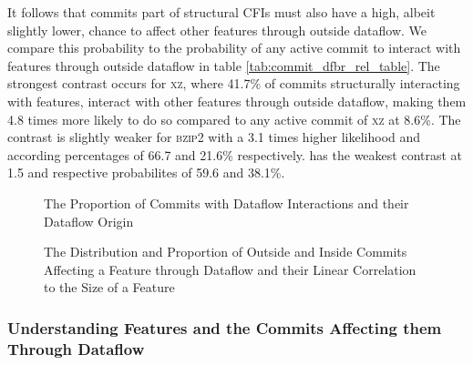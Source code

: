 It follows that commits part of structural CFIs must also have a high, albeit slightly lower, chance to affect other features through outside dataflow.
We compare this probability to the probability of any active commit to interact with features through outside dataflow in table \ref{tab:commit_dfbr_rel_table}.
The strongest contrast occurs for \textsc{xz}, where 41.7\% of commits structurally interacting with features, interact with other features through outside dataflow, making them 4.8 times more likely to do so compared to any active commit of \textsc{xz} at 8.6\%.
The contrast is slightly weaker for \textsc{bzip2} with a 3.1 times higher likelihood and according percentages of 66.7 and 21.6\% respectively. 
 has the weakest contrast at 1.5 and respective probabilites of 59.6 and 38.1\%. 

\begin{figure}[htbp]
  \centering
  
  \caption{The Proportion of Commits with Dataflow Interactions and their Dataflow Origin}
  \label{fig:commit_dfbr_plot}
\end{figure}

\clearpage

\begin{figure}[htbp]
  \centering
  
  \caption{The Distribution and Proportion of Outside and Inside Commits Affecting a Feature through Dataflow and their Linear Correlation to the Size of a Feature}
  \label{fig:feature_dfbr_plot}
\end{figure}

\clearpage

\subsubsection*{Understanding Features and the Commits Affecting them Through Dataflow}\label{sec:eval_feature_dfbr}

